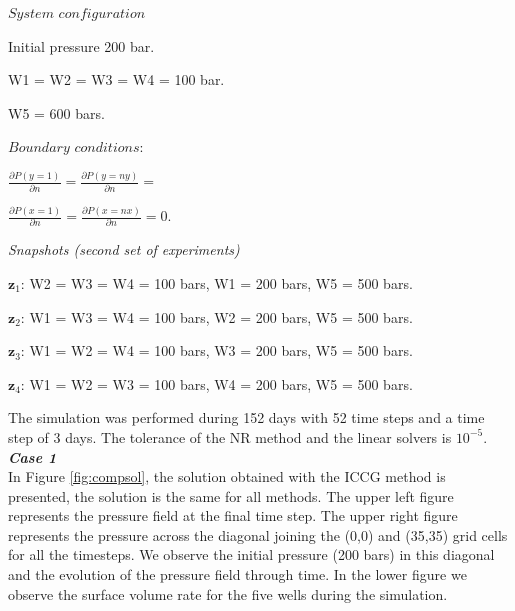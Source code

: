 \documentclass[12pt]{article}
\begin{document}
\begin{itemize}
\begin{minipage}{.6\textwidth}
\item[]  $System$ $configuration$
\item[] Initial pressure 200 bar.
 \item[]  W1 =  W2 = W3 = W4 = 100 bar.
 \item[] W5 = 600 bars.\\
 \end{minipage}%
\begin{minipage}{.4\textwidth}
\item[] $Boundary$ $conditions:$\\
\item[] $\frac{\partial P(y=1)}{\partial n}=\frac{\partial P(y=ny)}{\partial n}=$
\item[] $\frac{\partial P(x=1)}{\partial n}=\frac{\partial P(x=nx)}{\partial n}=0$.
\end{minipage}
\begin{minipage}{.8\textwidth}
\item[] \emph{Snapshots (second set of experiments)}
 \item[] $\mathbf{z}_1$:  W2 = W3 = W4 =  100 bars, 
 W1 = 200 bars, W5 = 500 bars.
\item[] $\mathbf{z}_2$: W1 = W3 = W4 = 100 bars,
 W2 = 200 bars, W5 = 500 bars.
\item[] $\mathbf{z}_3$: W1 = W2 = W4 = 100 bars,
 W3 = 200 bars, W5 =  500 bars.
\item[] $\mathbf{z}_4$:  W1 = W2 = W3 = 100 bars,
 W4 = 200 bars, W5 =  500 bars.\\
\end{minipage}%
\end{itemize}
The simulation was performed during 152 days with 52 time steps and a time step of 3 days. The tolerance of the NR method and the linear solvers is $10^{-5}$.\\
\emph{\textbf{Case 1}}\\
In Figure \ref{fig:compsol}, the solution obtained with the ICCG method is presented, the solution is the same for all methods. The upper left figure represents the pressure field at the final time step. The upper right figure represents the pressure across the diagonal joining the (0,0) and (35,35) grid cells for all the timesteps. We observe the initial pressure (200 bars) in this diagonal and the evolution of the pressure field through time. In the lower figure we observe the surface volume rate for the five wells during the simulation.\\
\end{document}
